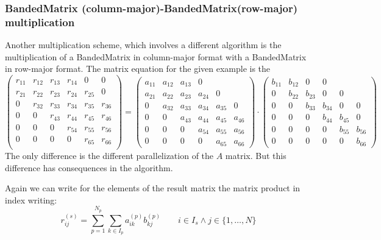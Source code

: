 \subsubsection{BandedMatrix (column-major)-BandedMatrix(row-major) multiplication}
Another multiplication scheme, which involves a different algorithm is
the multiplication of a BandedMatrix in column-major format with a
BandedMatrix in row-major format.
The matrix equation for the given example is the
\begin{equation}
  \label{eq:bmatcbmatrbmatr}
  \left(\begin{array}{cccccc}
      r_{11} &r_{12} &r_{13}& r_{14} & 0 & 0\\
      r_{21} &r_{22} &r_{23}& r_{24} & r_{25} & 0\\
      0 &r_{32} &r_{33}& r_{34} & r_{35} & r_{36}\\\hline
      0 & 0 &r_{43}& r_{44} & r_{45} & r_{46} \\
      0 & 0 & 0 & r_{54} & r_{55} & r_{56} \\
      0 & 0 & 0 & 0 & r_{65} & r_{66}\\
    \end{array}\right) =
  \left(\begin{array}{ccc|ccc}
      a_{11} &a_{12} &a_{13}& 0\\
      a_{21} &a_{22} &a_{23}& a_{24} & 0\\
      0 &a_{32} &a_{33}& a_{34} & a_{35} & 0\\
      0 & 0 &a_{43} &a_{44}& a_{45} & a_{46} \\
      0 & 0 &0 &a_{54} &a_{55}& a_{56}\\
      0 & 0 & 0 &0 &a_{65} &a_{66}
    \end{array}\right)
  \cdot
  \left(\begin{array}{cccccc}
      b_{11} &b_{12} & 0 & 0\\
      0 &b_{22} &b_{23}& 0 & 0\\
      0 & 0 &b_{33}& b_{34} & 0 & 0\\\hline
      0 & 0 & 0 &b_{44}& b_{45} & 0 \\
      0 & 0 & 0 & 0 &b_{55}& b_{56}\\
      0 & 0 & 0 & 0 & 0 &b_{66}
    \end{array}\right)
\end{equation}
The only difference is the different parallelization of the $A$
matrix. But this difference has consequences in the algorithm.

Again we can write for the elements of the result matrix the matrix
product in index writing:
\begin{equation}
  \label{eq:distr_mat}
  r_{ij}^{(s)}=\sum_{p=1}^{N_p}\sum_{k\in I_p} a_{ik}^{(p)}
  b_{kj}^{(p)}\qquad i\in I_s \wedge j\in\{1,\ldots,N\}
\end{equation}

